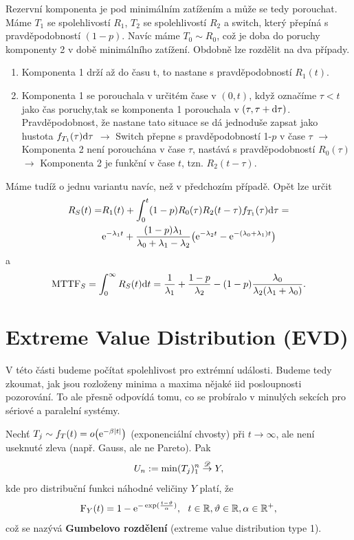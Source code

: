     Rezervní komponenta je pod minimálním zatížením a může se tedy porouchat.  Máme $T_1$ se spolehlivostí $R_1$, $T_2$ se spolehlivostí $R_2$ a switch, který přepíná s pravděpodobností $(1-p)$. Navíc máme $T_0 \sim R_0$, což je doba do poruchy komponenty 2 v době minimálního zatížení. Obdobně lze rozdělit na dva případy.
    \begin{enumerate}
        \item Komponenta 1 drží až do času t, to nastane s pravděpodobností $R_1(t)$.
        \item Komponenta 1 se porouchala v určitém čase v $(0,t)$, když označíme $\tau < t$ jako čas poruchy,tak se komponenta 1 porouchala v $(\tau,\tau + \mathrm{d}\tau)$. Pravděpodobnost, že nastane tato situace se dá jednoduše zapsat jako hustota $f_{T_1}(\tau)\mathrm{d}\tau$ $\longrightarrow$ Switch přepne s pravděpodobností 1-$p$ v čase $\tau$ $\longrightarrow$ Komponenta 2 není porouchána v čase $\tau$, nastává s pravděpodobností $R_0(\tau)$ $\longrightarrow$ Komponenta 2 je funkční v čase $t$, tzn. $R_2(t-\tau)$.
    \end{enumerate}
    
    Máme tudíž o jednu variantu navíc, než v předchozím případě. Opět lze určit 
    \begin{align*}
        R_S(t) = &	R_1(t) + \int_0^t (1-p)R_0(\tau)R_2(t-\tau) f_{T_1}(\tau)\mathrm{d}\tau = \\ &
        \mathrm{e}^{-\lambda_1 t} + \frac{(1-p)\lambda_1}{\lambda_0+\lambda_1-\lambda_2}\big(\mathrm{e}^{-\lambda_2 t} - \mathrm{e}^{-(\lambda_0 + \lambda_1) t} \big)
    \end{align*}
    a
    \begin{align*}
        \mathrm{MTTF}_S = \int_0^{\infty} R_S(t) \mathrm{d} t = \frac{1}{\lambda_1} + \frac{1-p}{\lambda_2} - (1-p)\frac{\lambda_0}{\lambda_2(\lambda_1 + \lambda_0)}.
    \end{align*}
    
\section{Extreme Value Distribution (EVD)}

    V této části budeme počítat spolehlivost pro extrémní události. Budeme tedy zkoumat, jak jsou rozloženy minima a maxima nějaké iid posloupnosti pozorování. To ale přesně odpovídá tomu, co se probíralo v minulých sekcích pro sériové a paralelní systémy.

    \begin{define}
        Nechť $T_j \sim f_T(t) = o\big(\mathrm{e}^{-\beta\left|t\right|} \big)$ (exponenciální chvosty) při $t \rightarrow \infty$, ale není useknuté zleva (např. Gauss, ale ne Pareto). Pak 
        $$ U_n:=\min(T_j)_1^n  \stackrel{\mathscr{D}}{\to} Y  ,$$ kde
        pro distribuční funkci náhodné veličiny $Y$ platí, že	
        $$ \mathrm{F}_Y(t)  = 1 - \mathrm{e}^{-\exp(\frac{t-\vartheta}{\alpha} )},~~t \in \mathbb{R}, \vartheta \in \mathbb{R}, \alpha \in\mathbb{R}^+,  $$
        což se nazývá \textbf{Gumbelovo rozdělení} (extreme value distribution type 1).
    \end{define}
    
